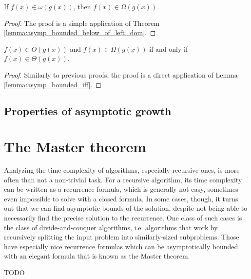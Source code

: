 \begin{theorem}
    \label{thm:big_omega_of_small_omega}
    \leanok
    If $f(x) \in \omega(g(x))$, then $f(x) \in \Omega(g(x))$.
\end{theorem}

\begin{proof}
    \leanok
    The proof is a simple application of Theorem 
    \ref{lemma:asymp_bounded_below_of_left_dom}.
\end{proof}

\begin{theorem}
    \label{thm:big_o_and_omega_iff_theta}
    \leanok
    $f(x) \in O(g(x))$ and $f(x) \in \Omega(g(x))$ if and only if $f(x) \in \Theta(g(x))$.
\end{theorem}

\begin{proof}
    \leanok
    Similarly to previous proofs, the proof is a direct application of Lemma 
    \ref{lemma:asymp_bounded_iff}.
\end{proof}


\subsection{Properties of asymptotic growth}



\section{The Master theorem}

Analyzing the time complexity of algorithms, especially recursive ones, is more often 
than not a non-trivial task. For a recursive algorithm, its time complexity can be 
written as a recurrence formula, which is generally not easy, sometimes even impossible 
to solve with a closed formula. In some cases, though, it turns out that we can find 
asymptotic bounds of the solution, despite not being able to necessarily find the 
precise solution to the recurrence. One class of such cases is the class of 
divide-and-conquer algorithms, i.e. algorithms that work by recursively splitting the input 
problem into similarly-sized subproblems. Those have especially nice recurrence formulas 
which can be asymptotically bounded with an elegant formula that is known as the Master theorem.

\begin{theorem}
TODO
\end{theorem}
